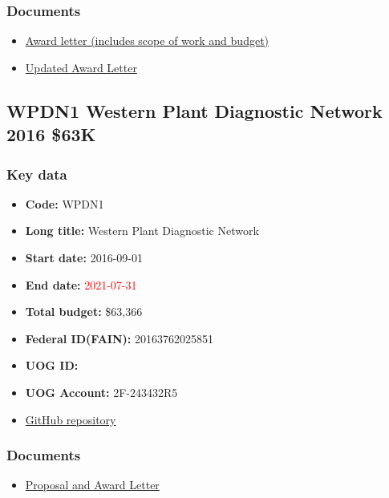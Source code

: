 \subsubsection{Documents}
\begin{itemize}
	\setlength\itemsep{0em}	
	\item \href{https://github.com/aubreymoore/Hypollimnas-octocula-conservation/blob/master/8spot-award-notice.pdf}{Award letter (includes scope of work and budget)}
	\item \href{https://github.com/aubreymoore/Hypollimnas-octocula-conservation/blob/master/8spot-award-notice-updated.pdf}{Updated Award Letter}
\end{itemize}





\newpage
\subsection{WPDN1 Western Plant Diagnostic Network 2016 \$63K}
\label{WPDN1}

\subsubsection{Key data}
\begin{itemize}
	\setlength\itemsep{0em}	
	\item \textbf{Code:} WPDN1
	\item \textbf{Long title:} Western Plant Diagnostic Network
	\item \textbf{Start date:} 2016-09-01
	\item \textbf{End date:} \textcolor{red}{2021-07-31}
	\item \textbf{Total budget:} \$63,366
	\item \textbf{Federal ID(FAIN):} 20163762025851
	\item \textbf{UOG ID:}
	\item \textbf{UOG Account:} 2F-243432R5
	\item \href{https://github.com/aubreymoore/WPDN}{GitHub repository}
\end{itemize}

\subsubsection{Documents}
\begin{itemize}
	\setlength\itemsep{0em}	
	\item \href{https://github.com/aubreymoore/WPDN/raw/main/WPDN\%20-award-2020.pdf}{Proposal and Award Letter}
\end{itemize}





